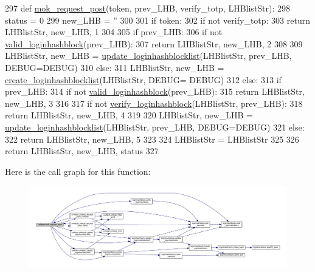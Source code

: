 \begin{DoxyCode}
297 \textcolor{keyword}{def }\hyperlink{namespaceunittest_afeccd95cc658ca5f2ffb4df7a1edbbd2}{mok\_request\_post}(token, prev\_LHB, verify\_totp, LHBlistStr):
298     status = 0
299     new\_LHB = \textcolor{stringliteral}{''}
300 
301     \textcolor{keywordflow}{if} token:
302         \textcolor{keywordflow}{if} \textcolor{keywordflow}{not} verify\_totp:
303             \textcolor{keywordflow}{return} LHBlistStr, new\_LHB, 1
304 
305         \textcolor{keywordflow}{if} prev\_LHB:
306             \textcolor{keywordflow}{if} \textcolor{keywordflow}{not} \hyperlink{namespaceloginhashblock_adb424539d851426da7b65d53c5a6d577}{valid\_loginhashblock}(prev\_LHB):
307                 \textcolor{keywordflow}{return} LHBlistStr, new\_LHB, 2
308 
309             LHBlistStr, new\_LHB = \hyperlink{namespaceloginhashblock_a2bcc7ddd0fcc3788572dd77808cb624d}{update\_loginhashblocklist}(LHBlistStr, prev\_LHB, 
      DEBUG=DEBUG)
310         \textcolor{keywordflow}{else}:
311             LHBlistStr, new\_LHB = \hyperlink{namespaceloginhashblock_a550707107141dfb228ca4294d7ea31b4}{create\_loginhashblocklist}(LHBlistStr, DEBUG=
      DEBUG)
312     \textcolor{keywordflow}{else}:
313         \textcolor{keywordflow}{if} prev\_LHB:
314             \textcolor{keywordflow}{if} \textcolor{keywordflow}{not} \hyperlink{namespaceloginhashblock_adb424539d851426da7b65d53c5a6d577}{valid\_loginhashblock}(prev\_LHB):
315                 \textcolor{keywordflow}{return} LHBlistStr, new\_LHB, 3
316 
317             \textcolor{keywordflow}{if} \textcolor{keywordflow}{not} \hyperlink{namespaceloginhashblock_aa5bb94484a68d0bbebce23b4cfeeb4b7}{verify\_loginhashblock}(LHBlistStr, prev\_LHB):
318                 \textcolor{keywordflow}{return} LHBlistStr, new\_LHB, 4
319 
320             LHBlistStr, new\_LHB = \hyperlink{namespaceloginhashblock_a2bcc7ddd0fcc3788572dd77808cb624d}{update\_loginhashblocklist}(LHBlistStr, prev\_LHB, 
      DEBUG=DEBUG)
321         \textcolor{keywordflow}{else}:
322             \textcolor{keywordflow}{return} LHBlistStr, new\_LHB, 5
323 
324     LHBlistStr = LHBlistStr
325 
326     \textcolor{keywordflow}{return} LHBlistStr, new\_LHB, status
327 
\end{DoxyCode}


Here is the call graph for this function\+:
\nopagebreak
\begin{figure}[H]
\begin{center}
\leavevmode
\includegraphics[width=350pt]{namespaceunittest_afeccd95cc658ca5f2ffb4df7a1edbbd2_cgraph}
\end{center}
\end{figure}




